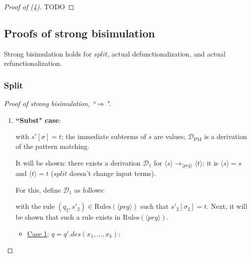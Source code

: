 \documentclass[11pt]{article} %
\begin{document}
\begin{proof}[Proof of (4)]

TODO

\end{proof}

\subsection{Proofs of strong bisimulation}

Strong bisimulation holds for $split$, actual defunctionalization, and actual refunctionalization.

\subsubsection{Split}

\begin{proof}[Proof of strong bisimulation, ``$\Rightarrow$"] ~

\begin{enumerate}
\item \textbf{``Subst" case}:

\begin{prooftree}
\end{prooftree}

with $s'[\sigma] = t$; the immediate subterms of $s$ are values; $\mathcal{D}_{\textrm{PM}}$ is a derivation of the pattern matching.

It will be shown: there exists a derivation $\mathcal{D}_1$ for $\langle s \rangle \longrightarrow_{\langle prg \rangle} \langle t \rangle$; it is $\langle s \rangle = s$ and $\langle t \rangle = t$ ($split$ doesn't change input terms).

For this, define $\mathcal{D}_1$ as follows:

\begin{prooftree}
\end{prooftree}

with the rule $(q_2, s'_2) \in \textrm{Rules}(\langle prg \rangle)$ such that $s'_2[\sigma_2] = t$. Next, it will be shown that such a rule exists in $\textrm{Rules}(\langle prg \rangle)$.

\begin{itemize}
\item \underline{Case 1}: $q = q'.des(x_1, ..., x_k)$:


\end{itemize}
\end{enumerate}
\end{proof}
\end{document}
